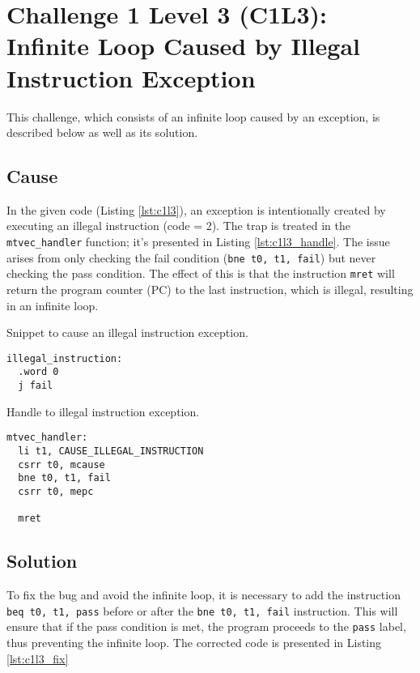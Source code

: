 \section{Challenge 1 Level 3 (C1L3): Infinite Loop Caused by Illegal Instruction Exception}

This challenge, which consists of an infinite loop caused by an exception, is described below as well as its solution.

\subsection{Cause}

In the given code (Listing \ref{lst:c1l3}), an exception is intentionally created by executing an illegal instruction (code = 2). The trap is treated in the \texttt{mtvec\_handler} function; it's presented in Listing \ref{lst:c1l3_handle}. The issue arises from only checking the fail condition (\texttt{bne t0, t1, fail}) but never checking the pass condition. The effect of this is that the instruction \texttt{mret} will return the program counter (PC) to the last instruction, which is illegal, resulting in an infinite loop.

\begin{listing}[h]
\caption{Snippet to cause an illegal instruction exception.}
\label{lst:c1l3}
\begin{verbatim}
illegal_instruction:
  .word 0              
  j fail
\end{verbatim}
\end{listing}

\begin{listing}[h]
\caption{Handle to illegal instruction exception.}
\label{lst:c1l3_handle}
\begin{verbatim}
mtvec_handler:
  li t1, CAUSE_ILLEGAL_INSTRUCTION
  csrr t0, mcause
  bne t0, t1, fail
  csrr t0, mepc

  mret
\end{verbatim}
\end{listing}

\subsection{Solution}

To fix the bug and avoid the infinite loop, it is necessary to add the instruction \texttt{beq t0, t1, pass} before or after the \texttt{bne t0, t1, fail} instruction. This will ensure that if the pass condition is met, the program proceeds to the \texttt{pass} label, thus preventing the infinite loop. The corrected code is presented in Listing \ref{lst:c1l3_fix}

